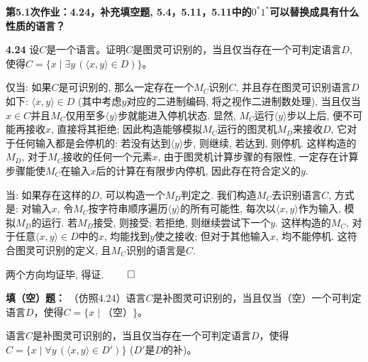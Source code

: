 \documentclass[UTF8]{report}
\newcommand{\problem}[1]{{\setlength{\parskip}{10pt}\noindent \bf{#1}}}
\newenvironment{solution}{{\noindent\hskip 2em \bf 解 \quad}}{}
\renewenvironment{proof}{{\setlength{\parskip}{7pt}\noindent\hskip 2em \bf 证明 \quad}}{\hfill$\qed$\par}
\begin{document}

\maketitle



\textbf{第5.1次作业：4.24，补充填空题, 5.4，5.11，5.11中的$0^*1^*$可以替换成具有什么性质的语言？}

\problem{4.24} 设$C $是一个语言。证明$C $是图灵可识别的，当且仅当存在一个可判定语言$D$, 使得$C=\{x \mid \exists y\, (\langle x,y\rangle\in D)\}$。

\begin{proof}
    仅当: 如果$C$是可识别的, 那么一定存在一个$M_C$识别$C$, 并且存在图灵可识别语言$D$如下: $\langle x,y \rangle \in D$ (其中考虑$y$对应的二进制编码, 将之视作二进制数处理), 当且仅当$x \in C$并且$M_C$仅用至多$\langle y \rangle$步就能进入停机状态. 显然, $M_C$运行$\langle y \rangle$步以上后, 便不可能再接收$x$, 直接将其拒绝; 因此构造能够模拟$M_C$运行的图灵机$M_D$来接收$D$, 它对于任何输入都是会停机的: 若没有达到$\langle y \rangle$步, 则继续, 若达到, 则停机. 这样构造的$M_D$, 对于$M_C$接收的任何一个元素$x$, 由于图灵机计算步骤的有限性, 一定存在计算步骤能使$M_C$在输入$x$后的计算在有限步内停机, 因此存在符合定义的$y$.

    当: 如果存在这样的$D$, 可以构造一个$M_D$判定之. 我们构造$M_C$去识别语言$C$, 方式是: 对输入$x$, 令$M_C$按字符串顺序遍历$\langle y \rangle$的所有可能性, 每次以$\langle x, y \rangle$作为输入, 模拟$M_D$的运行. 若$M_D$接受, 则接受; 若拒绝, 则继续尝试下一个$y$. 这样构造的$M_C$, 对于任意$\langle x,y\rangle\in D$中的$x$, 均能找到$y$使之接收; 但对于其他输入$x$, 均不能停机. 这符合图灵可识别的定义, 且$M_C$识别的语言是$C$.

    两个方向均证毕, 得证.
\end{proof}

\problem{填（空）题：} （仿照4.24）语言$C$是补图灵可识别的，当且仅当（空）一个可判定语言$D$，使得$C=\{x \mid （空）\}$。

\begin{solution}
    语言$C$是补图灵可识别的，当且仅当存在一个可判定语言$D$，使得$C=\{x \mid \forall y\, (\langle x,y\rangle\in D')\}$ ($D'$是$D$的补)。
\end{solution}
\end{document}
